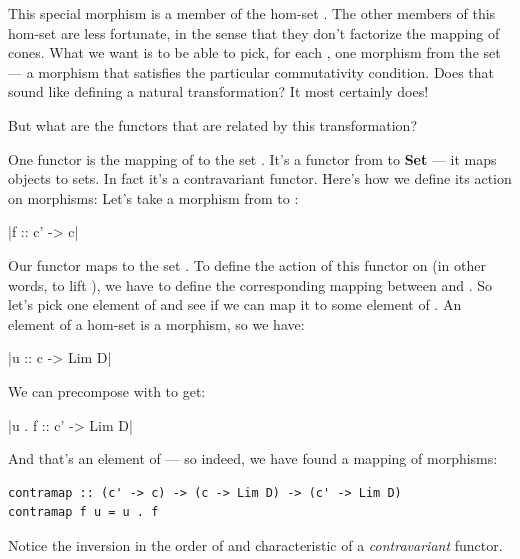 This special morphism is a member of the hom-set .
The other members of this hom-set are less fortunate, in the sense that
they don't factorize the mapping of cones. What we want is to be able to
pick, for each , one morphism from the set
 --- a morphism that satisfies the particular
commutativity condition. Does that sound like defining a natural
transformation? It most certainly does!

But what are the functors that are related by this transformation?

One functor is the mapping of  to the set
. It's a functor from  to \textbf{Set} ---
it maps objects to sets. In fact it's a contravariant functor. Here's
how we define its action on morphisms: Let's take a morphism 
from  to :

|f :: c' -> c|

Our functor maps  to the set
. To define the action of this functor on
 (in other words, to lift ), we have to define the
corresponding mapping between  and
. So let's pick one element  of
 and see if we can map it to some element of
. An element of a hom-set is a morphism, so
we have:

|u :: c -> Lim D|

We can precompose  with  to get:

|u . f :: c' -> Lim D|

And that's an element of --- so indeed, we
have found a mapping of morphisms:

\begin{verbatim}
contramap :: (c' -> c) -> (c -> Lim D) -> (c' -> Lim D) 
contramap f u = u . f
\end{verbatim}

Notice the inversion in the order of  and 
characteristic of a \emph{contravariant} functor.

\begin{figure}[H]
    \centering
\end{figure}


